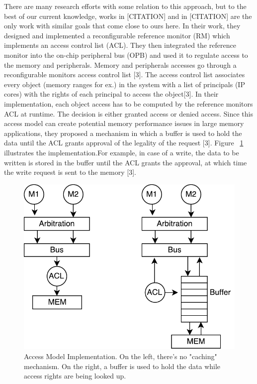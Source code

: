 \documentclass[sigconf]{acmart}
\theoremstyle{plain}
\theoremstyle{remark}
\begin{document}
There are many research efforts with some relation to this approach, but to the best of our current knowledge, works in [CITATION] and in [CITATION] are the only work with similar goals that come close to ours here. In their work, they designed and implemented a reconfigurable reference monitor (RM) which implements an access control list (ACL). They then integrated the reference monitor into the on-chip peripheral bus (OPB) and used it to regulate access to the memory and peripherals. Memory and peripherals accesses go through a reconfigurable monitors access control list [3]. The access control list associates every object (memory ranges for ex.) in the system with a list of principals (IP cores) with the rights of each principal to access the object[3]. In their implementation, each object access has to be computed by the reference monitors ACL at runtime. The decision is either granted access or denied access. Since this access model can create potential memory performance issues in large memory applications, they proposed a mechanism in which a buffer is used to hold the data until the ACL grants approval of the legality of the request [3]. Figure ~\ref{fig:ted} illustrates the implementation.For example, in case of a write, the data to be written is stored in the buffer until the ACL grants the approval, at which time the write request is sent to the memory [3].


\begin{figure}[hbt]
\centering 
\includegraphics[width=0.75\columnwidth]{figures/ted_access.pdf} 
\caption{Access Model Implementation. On the left, there's no "caching" mechanism. On the right, a buffer is used to hold the data while access rights are being looked up.} %
\label{fig:ted} 
\end{figure}
\end{document}
